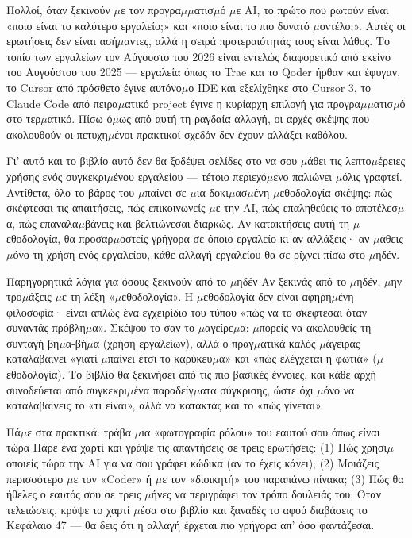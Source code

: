 Πολλοί, όταν ξεκινούν $\mu$ε τον προγρα$\mu$$\mu$ατισ$\mu$ό $\mu$ε AI, το πρώτο που ρωτούν είναι «ποιο είναι το καλύτερο εργαλείο;» και «ποιο είναι το πιο δυνατό $\mu$οντέλο;». Αυτές οι ερωτήσεις δεν είναι ασή$\mu$αντες, αλλά η σειρά προτεραιότητάς τους είναι λάθος. Το τοπίο των εργαλείων τον Αύγουστο του 2026 είναι εντελώς διαφορετικό από εκείνο του Αυγούστου του 2025 — εργαλεία όπως το Trae και το Qoder ήρθαν και έφυγαν, το Cursor από πρόσθετο έγινε αυτόνο$\mu$ο IDE και εξελίχθηκε στο Cursor 3, το Claude Code από πειρα$\mu$ατικό project έγινε η κυρίαρχη επιλογή για προγρα$\mu$$\mu$ατισ$\mu$ό στο τερ$\mu$ατικό. Πίσω ό$\mu$ως από αυτή τη ραγδαία αλλαγή, οι αρχές σκέψης που ακολουθούν οι πετυχη$\mu$ένοι πρακτικοί σχεδόν δεν έχουν αλλάξει καθόλου.

Γι' αυτό και το βιβλίο αυτό δεν θα ξοδέψει σελίδες στο να σου $\mu$άθει τις λεπτο$\mu$έρειες χρήσης ενός συγκεκρι$\mu$ένου εργαλείου — τέτοιο περιεχό$\mu$ενο παλιώνει $\mu$όλις γραφτεί. Αντίθετα, όλο το βάρος του $\mu$παίνει σε $\mu$ια δοκι$\mu$ασ$\mu$ένη $\mu$εθοδολογία σκέψης: πώς σκέφτεσαι τις απαιτήσεις, πώς επικοινωνείς $\mu$ε την AI, πώς επαληθεύεις το αποτέλεσ$\mu$α, πώς επαναλα$\mu$βάνεις και βελτιώνεσαι διαρκώς. Αν κατακτήσεις αυτή τη $\mu$εθοδολογία, θα προσαρ$\mu$οστείς γρήγορα σε όποιο εργαλείο κι αν αλλάξεις· αν $\mu$άθεις $\mu$όνο τη χρήση ενός εργαλείου, κάθε αλλαγή εργαλείου θα σε ρίχνει πίσω στο $\mu$ηδέν.

\begin{tcbinfo}{Παρηγορητικά λόγια για όσους ξεκινούν από το $\mu$ηδέν}
Αν ξεκινάς από το $\mu$ηδέν, $\mu$ην τρο$\mu$άξεις $\mu$ε τη λέξη «$\mu$εθοδολογία». Η $\mu$εθοδολογία δεν είναι αφηρη$\mu$ένη φιλοσοφία· είναι απλώς ένα εγχειρίδιο του τύπου «πώς να το σκέφτεσαι όταν συναντάς πρόβλη$\mu$α». Σκέψου το σαν το $\mu$αγείρε$\mu$α: $\mu$πορείς να ακολουθείς τη συνταγή βή$\mu$α-βή$\mu$α (χρήση εργαλείων), αλλά ο πραγ$\mu$ατικά καλός $\mu$άγειρας καταλαβαίνει «γιατί $\mu$παίνει έτσι το καρύκευ$\mu$α» και «πώς ελέγχεται η φωτιά» ($\mu$εθοδολογία). Το βιβλίο θα ξεκινήσει από τις πιο βασικές έννοιες, και κάθε αρχή συνοδεύεται από συγκεκρι$\mu$ένα παραδείγ$\mu$ατα σύγκρισης, ώστε όχι $\mu$όνο να καταλαβαίνεις το «τι είναι», αλλά να κατακτάς και το «πώς γίνεται».

\end{tcbinfo}

\begin{tcbpractice}{Πά$\mu$ε στα πρακτικά: τράβα $\mu$ια «φωτογραφία ρόλου» του εαυτού σου όπως είναι τώρα}
Πάρε ένα χαρτί και γράψε τις απαντήσεις σε τρεις ερωτήσεις: (1) Πώς χρησι$\mu$οποιείς τώρα την AI για να σου γράφει κώδικα (αν το έχεις κάνει); (2) Μοιάζεις περισσότερο $\mu$ε τον «Coder» ή $\mu$ε τον «διοικητή» του παραπάνω πίνακα; (3) Πώς θα ήθελες ο εαυτός σου σε τρεις $\mu$ήνες να περιγράφει τον τρόπο δουλειάς του; Όταν τελειώσεις, κρύψε το χαρτί $\mu$έσα στο βιβλίο και ξαναδές το αφού διαβάσεις το Κεφάλαιο 47 — θα δεις ότι η αλλαγή έρχεται πιο γρήγορα απ' όσο φαντάζεσαι.

\end{tcbpractice}

